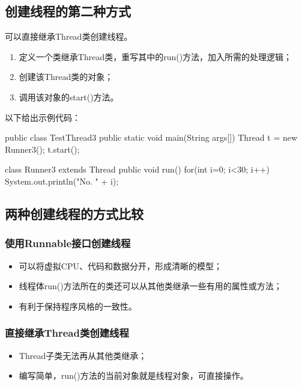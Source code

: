 \subsection{创建线程的第二种方式}

可以直接继承Thread类创建线程。

\begin{enumerate}
\item 定义一个类继承Thread类，重写其中的run()方法，加入所需的处理逻辑；
\item 创建该Thread类的对象；
\item 调用该对象的start()方法。
\end{enumerate}

以下给出示例代码：


\begin{javaCode}
public class TestThread3 {
  public static void main(String args[]) {
    Thread t = new Runner3();
    t.start();
  }
}

class Runner3 extends Thread {
  public void run() {
    for(int i=0; i<30; i++) {
      System.out.println("No. " + i);
    }
  }
}
\end{javaCode}


\subsection{两种创建线程的方式比较}

\subsubsection{使用Runnable接口创建线程}

\begin{itemize}
\item 可以将虚拟CPU、代码和数据分开，形成清晰的模型；
\item 线程体run()方法所在的类还可以从其他类继承一些有用的属性或方法；
\item 有利于保持程序风格的一致性。
\end{itemize}

\subsubsection{直接继承Thread类创建线程}

\begin{itemize}
\item Thread子类无法再从其他类继承；
\item 编写简单，run()方法的当前对象就是线程对象，可直接操作。
\end{itemize}

